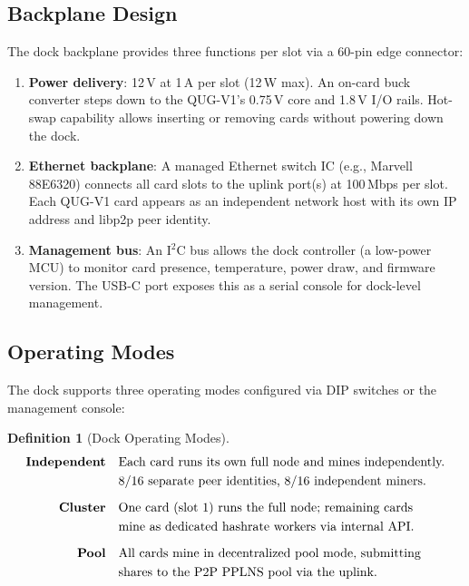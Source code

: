 \documentclass[11pt,a4paper]{article}
\newtheorem{definition}[theorem]{Definition}
\begin{document}
\subsection{Backplane Design}

The dock backplane provides three functions per slot via a 60-pin edge connector:

\begin{enumerate}[label=\textbf{\arabic*.}]
    \item \textbf{Power delivery}: 12\,V at 1\,A per slot (12\,W max). An on-card buck converter steps down to the QUG-V1's 0.75\,V core and 1.8\,V I/O rails. Hot-swap capability allows inserting or removing cards without powering down the dock.

    \item \textbf{Ethernet backplane}: A managed Ethernet switch IC (e.g., Marvell 88E6320) connects all card slots to the uplink port(s) at 100\,Mbps per slot. Each QUG-V1 card appears as an independent network host with its own IP address and libp2p peer identity.

    \item \textbf{Management bus}: An I$^2$C bus allows the dock controller (a low-power MCU) to monitor card presence, temperature, power draw, and firmware version. The USB-C port exposes this as a serial console for dock-level management.
\end{enumerate}

\subsection{Operating Modes}

The dock supports three operating modes configured via DIP switches or the management console:

\begin{definition}[Dock Operating Modes]
\label{def:dock_modes}
\begin{align}
    \textbf{Independent} &\quad\text{Each card runs its own full node and mines independently.} \\
    &\quad\text{8/16 separate peer identities, 8/16 independent miners.} \notag \\[6pt]
    \textbf{Cluster} &\quad\text{One card (slot 1) runs the full node; remaining cards} \\
    &\quad\text{mine as dedicated hashrate workers via internal API.} \notag \\[6pt]
    \textbf{Pool} &\quad\text{All cards mine in decentralized pool mode, submitting} \\
    &\quad\text{shares to the P2P PPLNS pool via the uplink.} \notag
\end{align}
\end{definition}
\end{document}
